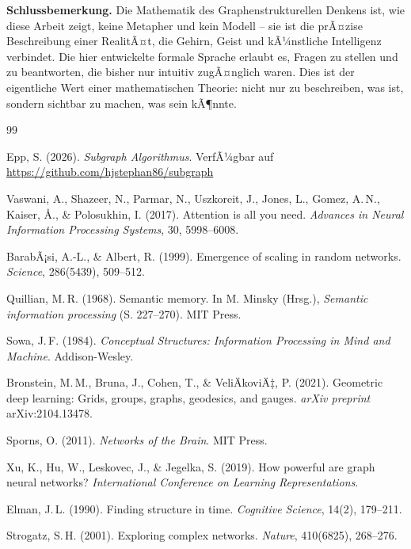 ﻿\documentclass[12pt,a4paper]{article}
\theoremstyle{plain}
\theoremstyle{definition}
\theoremstyle{remark}
\begin{document}
\textbf{Schlussbemerkung.} Die Mathematik des Graphenstrukturellen Denkens ist, wie diese Arbeit zeigt, keine Metapher und kein Modell -- sie ist die prÃ¤zise Beschreibung einer RealitÃ¤t, die Gehirn, Geist und kÃ¼nstliche Intelligenz verbindet. Die hier entwickelte formale Sprache erlaubt es, Fragen zu stellen und zu beantworten, die bisher nur intuitiv zugÃ¤nglich waren. Dies ist der eigentliche Wert einer mathematischen Theorie: nicht nur zu beschreiben, was ist, sondern sichtbar zu machen, was sein kÃ¶nnte.

\begin{thebibliography}{99}

Epp, S. (2026).
\textit{Subgraph Algorithmus}. VerfÃ¼gbar auf \url{https://github.com/hjstephan86/subgraph}

Vaswani, A., Shazeer, N., Parmar, N., Uszkoreit, J., Jones, L., Gomez, A.\,N., Kaiser, Å., \& Polosukhin, I. (2017).
Attention is all you need.
\textit{Advances in Neural Information Processing Systems}, 30, 5998--6008.

BarabÃ¡si, A.-L., \& Albert, R. (1999).
Emergence of scaling in random networks.
\textit{Science}, 286(5439), 509--512.

Quillian, M.\,R. (1968).
Semantic memory.
In M. Minsky (Hrsg.), \textit{Semantic information processing} (S. 227--270). MIT Press.

Sowa, J.\,F. (1984).
\textit{Conceptual Structures: Information Processing in Mind and Machine}. Addison-Wesley.

Bronstein, M.\,M., Bruna, J., Cohen, T., \& VeliÄkoviÄ‡, P. (2021).
Geometric deep learning: Grids, groups, graphs, geodesics, and gauges.
\textit{arXiv preprint} arXiv:2104.13478.

Sporns, O. (2011).
\textit{Networks of the Brain}. MIT Press.

Xu, K., Hu, W., Leskovec, J., \& Jegelka, S. (2019).
How powerful are graph neural networks?
\textit{International Conference on Learning Representations}.

Elman, J.\,L. (1990).
Finding structure in time.
\textit{Cognitive Science}, 14(2), 179--211.

Strogatz, S.\,H. (2001).
Exploring complex networks.
\textit{Nature}, 410(6825), 268--276.

\end{thebibliography}
\end{document}
